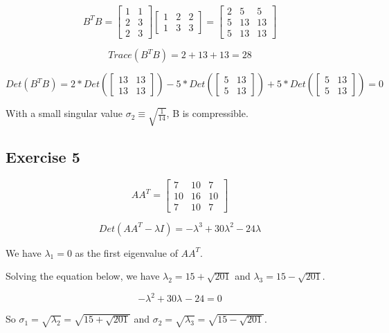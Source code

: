 \documentclass{article}
\begin{document}
\[
    B^{T}B =
    \begin{bmatrix}
        1 & 1 \\
        2 & 3 \\
        2 & 3
    \end{bmatrix}
    \begin{bmatrix}
        1 & 2 & 2 \\
        1 & 3 & 3
    \end{bmatrix}
    = \begin{bmatrix}
        2 & 5  & 5  \\
        5 & 13 & 13 \\
        5 & 13 & 13
    \end{bmatrix}
\]

\[
    Trace(B^{T}B) = 2 + 13 + 13 = 28
\]

\[
    Det(B^{T}B) = 2 * Det(\begin{bmatrix} 13 & 13 \\ 13 & 13 \end{bmatrix}) - 5 * Det(\begin{bmatrix} 5 & 13 \\ 5 & 13 \end{bmatrix}) + 5 * Det(\begin{bmatrix} 5 & 13 \\ 5 & 13 \end{bmatrix}) = 0
\]

With a small singular value $\sigma_{2} \equiv \sqrt{\frac{1}{14}}$, B is compressible.

\subsection{Exercise 5}
\[
    AA^{T}=
    \begin{bmatrix}
        7  & 10 & 7  \\
        10 & 16 & 10 \\
        7  & 10 & 7
    \end{bmatrix}
\]

\[
    Det(AA^{T} - \lambda I) = -\lambda^{3} + 30 \lambda^{2} - 24\lambda
\]

We have $\lambda_{1} = 0$ as the first eigenvalue of $AA^{T}$.

Solving the equation below, we have $\lambda_{2} = 15 + \sqrt{201}$ and $\lambda_{3} = 15 - \sqrt{201}$.

\[
    -\lambda^{2} + 30 \lambda^{} - 24 = 0
\]

So $\sigma_{1} = \sqrt{\lambda_{2}} = \sqrt{15 + \sqrt{201}}$ and $\sigma_{2} = \sqrt{\lambda_{3}} = \sqrt{15 - \sqrt{201}}$.
\end{document}
